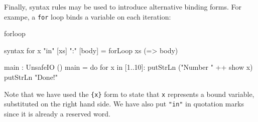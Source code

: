 Finally, syntax rules may be used to introduce alternative binding forms. For
exampe, a \texttt{for} loop binds a variable on each iteration:

\begin{SaveVerbatim}{forloop}

syntax for {x} "in" [xs] ":" [body] = forLoop xs (\x => body)
  
main : UnsafeIO ()
main = do for x in [1..10]:
              putStrLn ("Number " ++ show x)
          putStrLn "Done!"

\end{SaveVerbatim}

\noindent
Note that we have used the \texttt{\{x\}} form to state that \texttt{x} represents
a bound variable, substituted on the right hand side. We have also put \texttt{"in"} in
quotation marks since it is already a reserved word.



